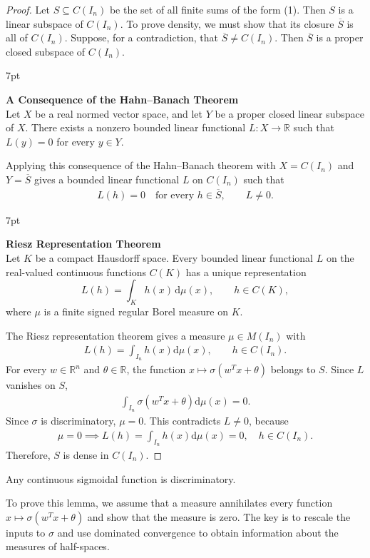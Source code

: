 \documentclass[12pt]{article}
\newenvironment{formal}{%
\def\FrameCommand{%
\hspace{1pt}%
{\color{Blue}\vrule width 2pt}%
{\color{formalshade}\vrule width 4pt}%
\colorbox{formalshade}%
}%
\MakeFramed{\advance\hsize-\width\FrameRestore}%
\noindent\hspace{-4.55pt}%
\begin{adjustwidth}{}{7pt}%
\vspace{2pt}\vspace{2pt}%
}
{%
\vspace{2pt}\end{adjustwidth}\endMakeFramed%
}
\begin{document}
\begin{proof}
    Let $S \subseteq C(I_n)$ be the set of all finite sums of the form (1). Then $S$ is a linear subspace of $C(I_n)$. To prove density, we must show that its closure $\overline{S}$ is all of $C(I_n)$. Suppose, for a contradiction, that $\overline{S} \neq C(I_n)$. Then $\overline{S}$ is a proper closed subspace of $C(I_n)$.
\begin{formal}
\textbf{A Consequence of the Hahn--Banach Theorem}\\
Let $X$ be a real normed vector space, and let $Y$ be a proper closed linear subspace of $X$. There exists a nonzero bounded linear functional $L:X\to\mathbb{R}$ such that $L(y)=0$ for every $y\in Y$.
\end{formal}

Applying this consequence of the Hahn--Banach theorem with $X=C(I_n)$ and $Y=\overline{S}$ gives a bounded linear functional $L$ on $C(I_n)$ such that
\begin{align*}
    L(h)=0\quad\text{for every }h\in\overline{S},\qquad L\neq 0.
\end{align*}

\begin{formal}
\textbf{Riesz Representation Theorem}\\
Let $K$ be a compact Hausdorff space. Every bounded linear functional $L$ on the real-valued continuous functions $C(K)$ has a unique representation
\[
L(h)=\int_K h(x)\,\mathrm{d}\mu(x),\qquad h\in C(K),
\]
where $\mu$ is a finite signed regular Borel measure on $K$.
\end{formal}
The Riesz representation theorem gives a measure $\mu\in M(I_n)$ with
\begin{align*}
    L(h)=\int_{I_n} h(x)\mathrm{d}\mu(x),\qquad h\in C(I_n).
\end{align*}
For every $w\in\mathbb{R}^n$ and $\theta\in\mathbb{R}$, the function $x\mapsto\sigma(w^T x + \theta)$ belongs to $S$. Since $L$ vanishes on $S$,
\begin{align*}
    \int_{I_n} \sigma(w^Tx+\theta)\mathrm{d}\mu(x)=0.
\end{align*}
Since $\sigma$ is discriminatory, $\mu = 0$. This contradicts $L \neq 0$, because
\begin{align*}
    \mu=0 \implies L(h)=\int_{I_n} h(x)\mathrm{d}\mu(x)=0,\quad h\in C(I_n).
\end{align*}
Therefore, $S$ is dense in $C(I_n)$. 
\end{proof}

\begin{mylemma}
    Any continuous sigmoidal function is discriminatory.
\end{mylemma}
To prove this lemma, we assume that a measure annihilates every function $x\mapsto\sigma(w^Tx+\theta)$ and show that the measure is zero. The key is to rescale the inputs to $\sigma$ and use dominated convergence to obtain information about the measures of half-spaces.
\end{document}

